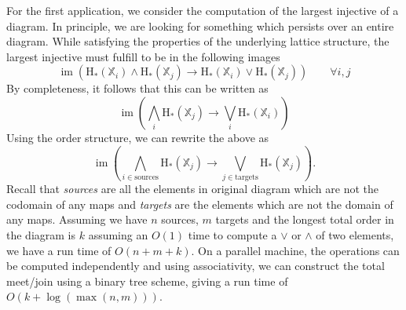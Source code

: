 \documentclass[10pt]{amsart}
\newcommand{\X}{\mathbb{X}}
\DeclareMathOperator{\im}{im}
\newcommand{\Hg}{\mathrm{H}}
\newcommand{\rto}{\rightarrow}
\newcommand{\meet}{\wedge}
\newcommand{\join}{\vee}
\begin{document}
%
%
%
%
%
%

For the first application, we consider the computation of the largest injective of a diagram. 
In principle, we are looking for something which persists over an entire diagram. 
While satisfying the properties of the underlying lattice structure, the largest injective must fulfill to be in the following images 
%
\begin{equation*}
\im\left(\Hg_*(\X_i) \meet \Hg_*(\X_j) \rto \Hg_*(\X_i) \join
\Hg_*(\X_j)\right) \qquad \forall i,j
\end{equation*}
By completeness, it follows that this can be written as 
\begin{equation*}
\im \left(\bigwedge\limits_i \Hg_*(\X_j) \rto \bigvee\limits_i
\Hg_*(\X_i)\right) 
\end{equation*}
Using the order structure, we
can rewrite the above as
\begin{equation*}
\im \left(\bigwedge\limits_{i\in\mathrm{sources}} \Hg_*(\X_j) \rto \bigvee\limits_{j\in\mathrm{targets}}
\Hg_*(\X_j)\right). 
\end{equation*}
%
Recall that \emph{sources} are all the elements in original diagram which are not the codomain of any maps and \emph{targets} are the elements which are not the domain of any maps. 
%
Assuming we have $n$ sources, $m$ targets and the longest total order in the diagram is $k$ assuming an $O(1)$ time to compute a $\join$ or $\meet$ of two elements, we have a run time of $O(n+m+k)$. 
On a parallel machine, the operations can be computed independently and using associativity, we can construct the total meet/join using a binary tree scheme, giving a run time of $O(k+\log (\max(n,m)) )$.
\end{document}

